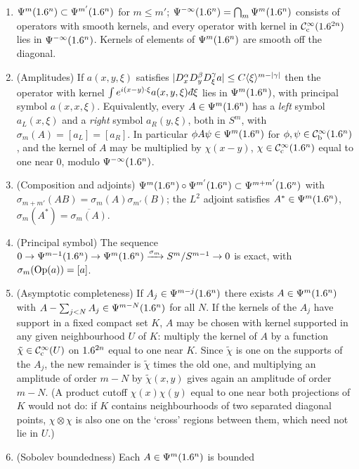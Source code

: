 \begin{enumerate}[label=(E\arabic*),leftmargin=3em]
\item\label{manifolds:E1} $\Psi^{m}(1.6^n)\subset\Psi^{m'}(1.6^n)$ for $m\le m'$;
$\Psi^{-\infty}(1.6^n)=\bigcap_m\Psi^{m}(1.6^n)$ consists of operators with smooth
kernels, and every operator with kernel in $\mathcal{C}^\infty_{\mathrm{c}}(1.6^{2n})$ lies in
$\Psi^{-\infty}(1.6^n)$. Kernels of elements of $\Psi^{m}(1.6^n)$ are smooth off the
diagonal.
\item\label{manifolds:E2} (Amplitudes) If $a(x,y,\xi)$ satisfies
$|D^\alpha_xD^\beta_yD^\gamma_\xi a|\le C\langle \xi\rangle^{m-|\gamma|}$ then the operator with
kernel $\int e^{i(x-y)\cdot\xi}a(x,y,\xi)\,\dbar\xi$ lies in $\Psi^{m}(1.6^n)$, with
principal symbol $a(x,x,\xi)$. Equivalently, every $A\in\Psi^{m}(1.6^n)$ has a
\emph{left} symbol $a_L(x,\xi)$ and a \emph{right} symbol $a_R(y,\xi)$, both in
$S^m$, with $\sigma_m(A)=[a_L]=[a_R]$. In particular $\phi A\psi\in\Psi^{m}(1.6^n)$ for
$\phi,\psi\in\mathcal{C}^\infty_{\mathrm{b}}(1.6^n)$, and the kernel of $A$ may be multiplied by $\chi(x-y)$,
$\chi\in\mathcal{C}^\infty_{\mathrm{c}}(1.6^n)$ equal to one near $0$, modulo $\Psi^{-\infty}(1.6^n)$.
\item\label{manifolds:E3} (Composition and adjoints) $\Psi^{m}(1.6^n)\circ\Psi^{m'}(1.6^n)\subset\Psi^{m+m'}(1.6^n)$ with
$\sigma_{m+m'}(AB)=\sigma_m(A)\sigma_{m'}(B)$; the $L^2$ adjoint satisfies
$A^*\in\Psi^{m}(1.6^n)$, $\sigma_m(A^*)=\overline{\sigma_m(A)}$.
\item\label{manifolds:E4} (Principal symbol) The sequence
$0\to\Psi^{m-1}(1.6^n)\to\Psi^{m}(1.6^n)\xrightarrow{\sigma_m}S^m/S^{m-1}\to0$ is exact,
with $\sigma_m(\operatorname{Op}(a))=[a]$.
\item\label{manifolds:E5} (Asymptotic completeness) If $A_j\in\Psi^{m-j}(1.6^n)$
there exists $A\in\Psi^{m}(1.6^n)$ with $A-\sum_{j<N}A_j\in\Psi^{m-N}(1.6^n)$ for all
$N$. If the kernels of the $A_j$ have support in a fixed compact set $K$, $A$ may
be chosen with kernel supported in any given neighbourhood $U$ of $K$: multiply the
kernel of $A$ by a function $\tilde\chi\in\mathcal{C}^\infty_{\mathrm{c}}(U)$ on $1.6^{2n}$ equal to one near $K$.
Since $\tilde\chi$ is one on the supports of the $A_j$, the new remainder is $\tilde\chi$
times the old one, and multiplying an amplitude of order $m-N$ by
$\tilde\chi(x,y)$ gives again an amplitude of order $m-N$. (A product cutoff
$\chi(x)\chi(y)$ equal to one near both projections of $K$ would not do: if $K$ contains
neighbourhoods of two separated diagonal points, $\chi\otimes\chi$ is also one on the
`cross' regions between them, which need not lie in $U$.)
\item\label{manifolds:E6} (Sobolev boundedness) Each $A\in\Psi^{m}(1.6^n)$ is bounded

\end{enumerate}
